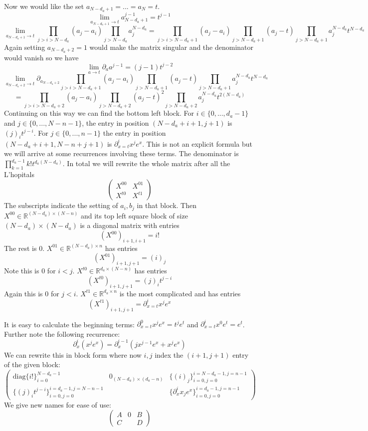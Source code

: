 \documentclass{article}
\newcommand{\R}{{\mathbb{R}}}
\begin{document}
Now we would like the set $a_{N-d_{a}+1} = ... = a_{N} = t$. 
\[ \lim_{a_{N-d_{a}+1} \to t} a_{N-d_{a}+1}^{j-1} = t^{j-1}     \]
\[ \lim_{a_{N-d_{a}+1} \to t} \prod_{j > i > N-d_{a}} (a_{j} - a_{i}) \prod_{j > N-d_{a}} a_{j}^{N-d_{a}} = \prod_{j > i > N-d_{a}+1} (a_{j} - a_{i}) \prod_{j > N-d_{a}+1} (a_{j} -t) \prod_{j > N-d_{a} + 1} a_{j}^{N-d_{a}} t^{N-d_{a}}    \]
Again setting $a_{N-d_{a}+2} = 1$ would make the matrix singular and the denominator would vanish so we have
\[ \lim_{a \to t} \partial_{a} a^{j-1} = (j-1) t^{j-2}    \]
\[ \lim_{a_{N-d_{a}+2} \to t} \partial_{a_{N-d_{a}+2}} \prod_{j > i > N-d_{a}+1} (a_{j} - a_{i}) \prod_{j > N-d_{a}+1} (a_{j} -t) \prod_{j > N-d_{a} + 1} a_{j}^{N-d_{a}} t^{N-d_{a}} \]
\[= \prod_{j > i > N-d_{a}+2} (a_{j} - a_{i}) \prod_{j > N-d_{a}+2} (a_{j} -t)^{2} \prod_{j > N-d_{a} + 2} a_{j}^{N-d_{a}} t^{2(N-d_{a})}     \]
Continuing on this way we can find the bottom left block. For $i \in \{0, ..., d_{a}-1\}$ and $j \in \{0, ..., N-n-1\}$, the entry in position $(N-d_{a}+i+1,j+1)$ is $(j)_{i} t^{j-i}$. For $j \in \{0, ..., n-1\}$ the entry in position $(N-d_{a}+i+1,N-n+j+1)$ is $\partial_{x=t}^{i} x^{j} e^{x}$. This is not an explicit formula but we will arrive at some recurrences involving these terms. The denominator is $\prod_{k=1}^{d_{a}-1} k! t^{d_{a}(N-d_{a})}$. In total we will rewrite the whole matrix after all the L'hopitals
\[ \begin{pmatrix}  X^{00} & X^{01} \\ X^{t0} & X^{t1} \end{pmatrix}     \]
The subscripts indicate the setting of $a_{i}, b_{j}$ in that block. Then $X^{00} \in \R^{(N-d_{a}) \times (N-n)}$ and its top left square block of size $(N-d_{a}) \times (N-d_{a})$ is a diagonal matrix with entries 
\[  (X^{00})_{i+1,i+1} = i! \]
The rest is $0$. $X^{01} \in \R^{(N-d_{a}) \times n}$ has entries 
\[ (X^{01})_{i+1,j+1} = (i)_{j}    \]
Note this is $0$ for $i < j$. $X^{t0} \in \R^{d_{a} \times (N-n)}$ has entries 
\[ (X^{t0})_{i+1,j+1} = (j)_{i} t^{j-i}     \]
Again this is $0$ for $j < i$. $X^{t1} \in \R^{d_{a} \times n}$ is the most complicated and has entries 
\[ (X^{t1})_{i+1,j+1} = \partial_{x=t}^{i} x^{j} e^{x}  \]

It is easy to calculate the beginning terms: $\partial_{x=t}^{0} x^{j} e^{x} = t^{j} e^{t}$ and $\partial_{x=t}^{i} x^{0} e^{t} = e^{t}$. Further note the following recurrence:
\[ \partial_{x}^{i} (x^{j} e^{x}) = \partial_{x}^{i-1} (j x^{j-1} e^{x} + x^{j} e^{x})   \]
We can rewrite this in block form where now $i,j$ index the $(i+1,j+1)$ entry of the given block:
\[ \begin{pmatrix} \text{diag}\{i!\}_{i=0}^{N-d_{a}-1} & 0_{(N-d_{a}) \times (d_{a}-n)} & \{(i)_{j}\}_{i=0,j=0}^{i=N-d_{a}-1, j=n-1}
\\ \{(j)_{i} t^{j-i}\}_{i=0,j=0}^{i=d_{a}-1,j=N-n-1} & & \{\partial_{x}^{i} x_{j} e^{x} \}_{i=0,j=0}^{i=d_{a}-1,j=n-1}
\end{pmatrix}     \]
We give new names for ease of use:
\[ \begin{pmatrix} A & 0 & B
\\ C & & D
\end{pmatrix}     \]
\end{document}
